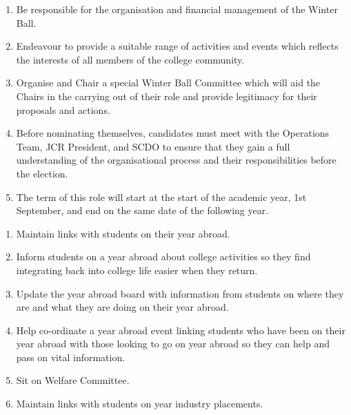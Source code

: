 \begin{enumerate}
    \item Be responsible for the organisation and financial management of the Winter Ball.
    \item Endeavour to provide a suitable range of activities and events which reflects the interests of all members of the college community.
    \item Organise and Chair a special Winter Ball Committee which will aid the Chairs in the carrying out of their role and provide legitimacy for their proposals and actions.
    \item Before nominating themselves, candidates must meet with the Operations Team, JCR President, and SCDO to ensure that they gain a full understanding of the organisational process and their responsibilities before the election.
    \item The term of this role will start at the start of the academic year, 1st September, and end on the same date of the following year.

    
\end{enumerate}

\begin{enumerate}
    \item Maintain links with students on their year abroad.
    \item Inform students on a year abroad about college activities so they find integrating back into college life easier when they return.
    \item Update the year abroad board with information from students on where they are and what they are doing on their year abroad.
    \item Help co-ordinate a year abroad event linking students who have been on their year abroad with those looking to go on year abroad so they can help and pass on vital information.
    \item Sit on Welfare Committee.
    \item Maintain links with students on year industry placements.
\end{enumerate}

